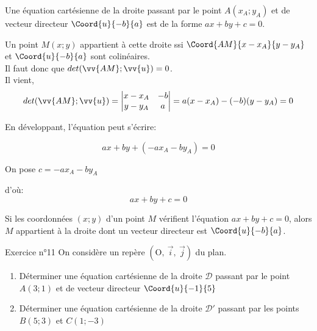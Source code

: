 \documentclass[12pt,a4paper]{article}
\def\Oij{$\left(\text{O},~\vec{i},~\vec{j}\right)$}
\begin{document}
\begin{pro}
Une équation cartésienne de la droite passant par le point $A(x_A;y_A)$ et de vecteur directeur $\Coord{u}{-b}{a}$ est de la forme $ax+by+c=0$.
\end{pro}

\begin{pf}
Un point $M(x;y)$ appartient à cette droite ssi $\Coord{AM}{x-x_A}{y-y_A}$ et $\Coord{u}{-b}{a}$ sont colinéaires.\\
Il faut donc que $det(\vv{AM};\vv{u})=0$.\\
Il vient, $$det(\vv{AM};\vv{u})=\begin{vmatrix} x-x_A & -b \\ y-y_A & a \end{vmatrix}=a(x-x_A)-(-b)(y-y_A)=0$$

En développant, l'équation peut s'écrire:

$$ax+by+(-ax_A-by_A)=0$$

On pose $c=-ax_A-by_A$

d'où: $$\boxed{ax+by+c=0}$$

\end{pf}



\begin{reci}
Si les coordonnées $(x;y)$ d'un point $M$ vérifient l'équation $ax+by+c=0$, alors $M$ appartient à la droite dont un vecteur directeur est $\Coord{u}{-b}{a}$.


\end{reci}

\begin{mybox}{Exercice n°11}
On considère un repère \Oij{} du plan.

\begin{enumerate}
    \item Déterminer une équation cartésienne de la droite $\mathscr{D}$ passant par le point $A(3;1)$ et de vecteur directeur $\Coord{u}{-1}{5}$
    \item Déterminer une équation cartésienne de la droite $\mathscr{D'}$ passant par les points $B(5;3)$ et $C(1;-3)$
\end{enumerate}

\end{mybox}

\begin{framed}
\vspace{3cm}
\end{framed}
\end{document}

